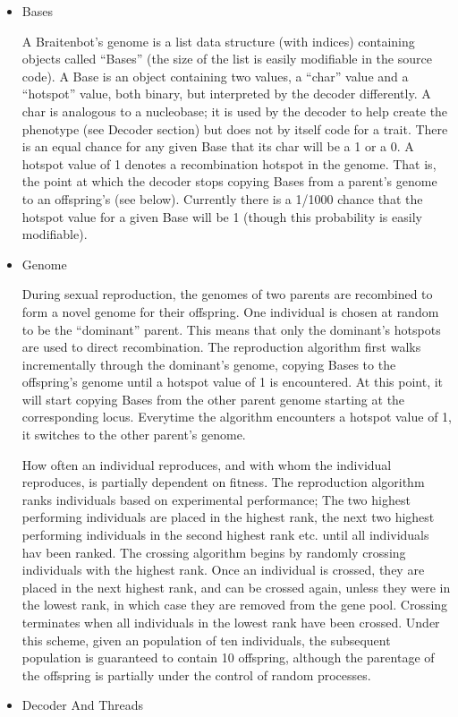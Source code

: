 \documentclass[11pt]{article}
\begin{document}
\begin{itemize}
\item Bases
\label{sec:orgheadline15}

A Braitenbot’s genome is a list data structure (with indices) containing objects called “Bases” (the size of the list is easily modifiable in the source code). A Base is an object containing two values, a “char” value and a “hotspot” value, both binary, but interpreted by the decoder differently.  A char is analogous to a nucleobase; it is used by the decoder to help create the phenotype (see Decoder section) but does not by itself code for a trait. There is an equal chance for any given Base that its char will be a 1 or a 0.  A hotspot value of 1 denotes a recombination hotspot in the genome. That is, the point at which the decoder stops copying Bases from a parent’s genome to an offspring’s (see below). Currently there is a 1/1000 chance that the hotspot value for a given Base will be 1 (though this probability is easily modifiable).

\item Genome
\label{sec:orgheadline16}

During sexual reproduction, the genomes of two parents are recombined to form a novel genome for their offspring. One individual is chosen at random to be the “dominant” parent. This means that only the dominant’s hotspots are used to direct recombination. The reproduction algorithm first walks incrementally through the dominant’s genome, copying Bases to the offspring’s genome until a hotspot value of 1 is encountered. At this point, it will start copying Bases from the other parent genome starting at the corresponding locus. Everytime the algorithm encounters a hotspot value of 1, it switches to the other parent's genome. 

How often an individual reproduces, and with whom the individual reproduces, is partially dependent on fitness. The reproduction algorithm ranks individuals based on experimental performance; The two highest performing individuals are placed in the highest rank, the next two highest performing individuals in the second highest rank etc. until all individuals hav been ranked. The crossing algorithm begins by randomly crossing individuals with the highest rank. Once an individual is crossed, they are placed in the next highest rank, and can be crossed again, unless they were in the lowest rank, in which case they are removed from the gene pool. Crossing terminates when all individuals in the lowest rank have been crossed. Under this scheme, given an population of ten individuals, the subsequent population is guaranteed to contain 10 offspring, although the parentage of the offspring is partially under the control of random processes.
\item Decoder And Threads
\label{sec:orgheadline17}


\end{itemize}
\end{document}
